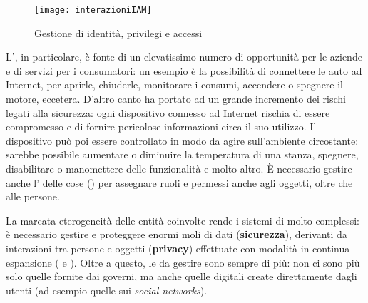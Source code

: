 \begin{figure}[h]
\begin{center}
\texttt{[image: interazioniIAM]}
\caption[Gestione di identità, privilegi e accessi]{Gestione di identità, privilegi e accessi\protect\footnotemark}
\label{fig:interazioniIAM}
\end{center}
\end{figure}

L', in particolare, è fonte di un elevatissimo numero di opportunità per le aziende e di servizi per i consumatori: un esempio è la possibilità di connettere le auto ad Internet, per aprirle, chiuderle, monitorare i consumi, accendere o spegnere il motore, eccetera. D'altro canto ha portato ad un grande incremento dei rischi legati alla sicurezza: ogni dispositivo connesso ad Internet rischia di essere compromesso e di fornire pericolose informazioni circa il suo utilizzo. Il dispositivo può poi essere controllato in modo da agire sull'ambiente circostante: sarebbe possibile aumentare o diminuire la temperatura di una stanza, spegnere, disabilitare o manomettere delle funzionalità e molto altro. È necessario gestire anche l' delle cose () per assegnare ruoli e permessi anche agli oggetti, oltre che alle persone. 

La marcata eterogeneità delle entità coinvolte rende i sistemi di  molto complessi: è necessario gestire e proteggere enormi moli di dati (\textbf{sicurezza}), derivanti da interazioni tra persone e oggetti (\textbf{privacy}) effettuate con modalità in continua espansione (\textbf{} e \textbf{}). Oltre a questo, le  da gestire sono sempre di più: non ci sono più solo quelle fornite dai governi, ma anche quelle digitali create direttamente dagli utenti (ad esempio quelle sui \textit{social networks}).

